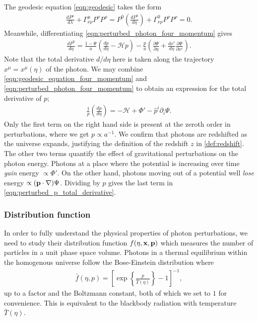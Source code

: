 The geodesic equation \eqref{eqn:geodesic} takes the form
\begin{align}
	\frac{dP^\mu}{d\lambda} + \Gamma^\mu_{\nu\rho} P^\nu P^\rho = P^0 \left( \frac{dP^0}{d\eta} \right) + \Gamma^0_{\nu\rho} P^\nu P^\rho = 0.  \label{eqn:geodesic_equation_four_momentum}
\end{align}
Meanwhile, differentiating \eqref{eqn:perturbed_photon_four_momentum} gives
\begin{align}
	\frac{dP^0}{d\eta} = \frac{1-\Psi}{a} \left( \frac{dp}{d\eta} - \mathcal{H}p \right) - \frac{p}{a} \left( \frac{\partial\Psi}{\partial\eta} + \frac{dx^i}{d\eta} \frac{\partial\Psi}{\partial x^i}  \right). \label{eqn:perturbed_energy_total_derivative}
\end{align}
Note that the total derivative $d/d\eta$ here is taken along the trajectory $x^\mu = x^\mu(\eta)$ of the photon. We may combine \eqref{eqn:geodesic_equation_four_momentum} and \eqref{eqn:perturbed_photon_four_momentum} to obtain an expression for the total derivative of $p$;
\begin{align}
	\frac{1}{p} \left( \frac{dp}{d\eta} \right) = - \mathcal{H} + \Phi' - \hat{p}^i \partial_i \Psi. \label{eqn:perturbed_p_total_derivative}
\end{align}
Only the first term on the right hand side is present at the zeroth order in perturbations, where we get $p\propto a^{-1}$. We confirm that photons are redshifted as the universe expands, justifying the definition of the redshift $z$ in \eqref{def:redshift}. The other two terms quantify the effect of gravitational perturbations on the photon energy. Photons at a place where the potential is increasing over time \textit{gain} energy $\propto\Phi'$. On the other hand, photons moving out of a potential well \textit{lose} energy $\propto({\mathbf{p}}\cdot\nabla)\Psi$. Dividing by $p$ gives the last term in \eqref{eqn:perturbed_p_total_derivative}.


\subsubsection*{Distribution function} \label{section:distribution_function}

In order to fully understand the physical properties of photon perturbations, we need to study their distribution function $f(\eta,\mathbf{x},\mathbf{p})$ which measures the number of particles in a unit phase space volume. Photons in a thermal equilibrium within the homogenous universe follow the Bose-Einstein distribution where   
\begin{align}
	\bar{f}(\eta, p) = \left[ \exp \left\{ \frac{p}{\bar{T}(\eta)} \right\} - 1 \right]^{-1}, \label{eqn:photon_distribution_function}
\end{align}
up to a factor and the Boltzmann constant, both of which we set to $1$ for convenience. This is equivalent to the blackbody radiation with temperature $\bar{T}(\eta)$.

